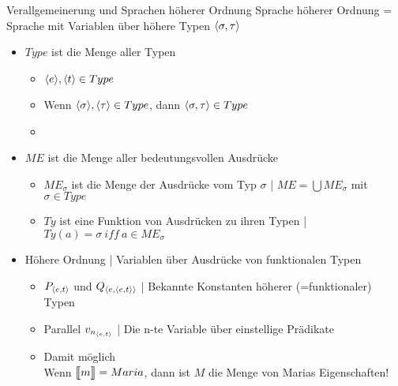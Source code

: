 \begin{frame}
  {Verallgemeinerung und Sprachen höherer Ordnung}
  \onslide<+->
  \onslide<+->
  Sprache höherer Ordnung = Sprache mit \alert{Variablen über höhere Typen ${\langle{}\sigma,\tau\rangle}$}\\
  \Halbzeile
  \begin{itemize}[<+->]
    \item $Type$ ist die Menge aller Typen
      \begin{itemize}[<+->]
        \item \alert{${\langle{}e\rangle},{\langle{}t\rangle}\in Type$}
        \item Wenn ${\langle{}\sigma\rangle},{\langle{}\tau\rangle}\in Type$, dann \alert{${\langle{}\sigma,\tau\rangle}\in Type$}
        \item {}
      \end{itemize}
      \Viertelzeile 
    \item $ME$ ist die Menge aller bedeutungsvollen Ausdrücke
      \begin{itemize}[<+->]
        \item $ME_{\sigma}$ ist die Menge der Ausdrücke vom Typ $\sigma$ | $ME=\bigcup ME_{\sigma}$ mit $\sigma\in Type$
        \item $Ty$ ist eine Funktion von Ausdrücken zu ihren Typen | $Ty(a)=\sigma\ iff\ a\in ME_{\sigma}$
      \end{itemize}
      \Halbzeile
    \item Höhere Ordnung | \alert{Variablen über Ausdrücke von funktionalen Typen}
      \begin{itemize}[<+->]
        \item $P_{{\langle{}e,t\rangle}}$ und $Q_{{\langle{}e,{\langle{}e,t\rangle}\rangle}}$ | Bekannte \alert{Konstanten} höherer (=funktionaler) Typen
        \item Parallel \alert{$v_{n_{{\langle{}e,t\rangle}}}$} | Die \alert{n-te Variable über einstellige Prädikate}
          \Viertelzeile
        \item Damit möglich \\
          Wenn $\dem{m}=Maria$, dann ist $M$ die Menge von Marias Eigenschaften!
      \end{itemize}
  \end{itemize}
\end{frame}

